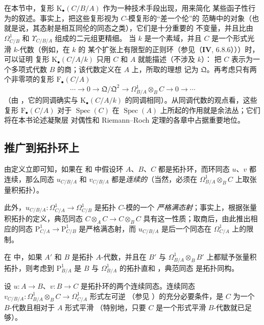 \begin{remark}[20.6.26]
\label{0.20.6.26-fr}
在本节中，复形 $\mathrm{K}_\bullet(C/B/A)$ 作为一种技术手段出现，用来简化
某些函子性行为的叙述。事实上，把这些复形视为
$C$-模复形的“差一个伦”的
范畴中的对象（也就是说，其态射是相互同伦的同态之类），它们是十分重要的
不变量，并且比由 $\Omega^1_{C/B}$ 和 $\Upsilon_{C/B/A}$ 组成的二元组更精细。
当 $k$ 是一个素域，并且 $C$ 是一个形式光滑 $k$-代数（例如，在 $k$ 的
某个扩张上有限型的正则环（参见（$\mathbf{IV}$, 6.8.6）））时，可以证明
复形 $\mathrm{K}_\bullet(C/A/k)$ 只用 $C$ 和 $A$ 就能描述（不涉及 $k$）：
把 $C$ 表示为一个多项式代数 $B$ 的商；该代数定义在 $A$ 上，所取的理想
记为 $\mathfrak{Q}$。再考虑只有两个非零项的复形
$\mathrm{F}_\bullet(C/A)$
\[
  \cdots\to0\to\mathfrak{Q}/\mathfrak{Q}^2\to
  \Omega^1_{B/A}\otimes_B C\to0\to\cdots
\]
（由 ，它的同调确实与
$\mathrm{K}_\bullet(C/A/k)$ 的同调相同）。从同调代数的观点看，这些复形
$\mathrm{F}_\bullet(C/A)$ 对于 $\operatorname{Spec}(C)$ 在
$\operatorname{Spec}(A)$ 上所起的作用就是余法丛；它们将在本书论述凝聚层
对偶性和 Riemann--Roch 定理的各章中占据重要地位。
\end{remark}

\subsection{推广到拓扑环上}
\label{subsection:0.20.7-fr}

\begin{env}[20.7.1]
\label{0.20.7.1-fr}
由定义立即可知，如果在  和  中假设环
$A$、$B$、$C$ 都是拓扑环，而环同态 $u$、$v$ 都连续，那么同态
$u_{C/B/A}$ 和 $v_{C/B/A}$ 都是\emph{连续的}（当然，必须在
$\Omega^1_{B/A}\otimes_B C$ 上取张量积拓扑）。

此外，$u_{C/B/A}:\Omega^1_{C/A}\to\Omega^1_{C/B}$ 是拓扑 $C$-模的一个
\emph{严格满态射}；事实上，根据张量积拓扑的定义，典范同态
$C\otimes_A C\to C\otimes_B C$ 具有这一性质；取商后，由此推出相应的同态
$\mathrm{P}^1_{C/A}\to\mathrm{P}^1_{C/B}$ 是严格满态射，而
$u_{C/B/A}$ 是后一个同态在 $\Omega^1_{C/A}$ 上的限制。

在  中，如果 $A'$ 和 $B$ 是拓扑 $A$-代数，并且在
$B'$ 与 $\Omega^1_{B/A}\otimes_B B'$ 上都赋予张量积拓扑，则考虑到
$\mathrm{P}^1_{B/A}$ 是 $B$ 与 $\Omega^1_{B/A}$ 的拓扑直和
，典范同态  是拓扑同构。
\end{env}

\begin{proposition}[20.7.2]
\label{0.20.7.2-fr}
设 $u:A\to B$、$v:B\to C$ 是拓扑环的两个连续同态。连续同态
$v_{C/B/A}:\Omega^1_{B/A}\otimes_B C\to\Omega^1_{C/A}$ 形式左可逆
（参见 ）的充分必要条件，是 $C$ 为一个 $B$-代数且相对于
$A$ 形式平滑 （特别地，只要 $C$ 是一个形式平滑
$B$-代数就已足够）。
\end{proposition}

